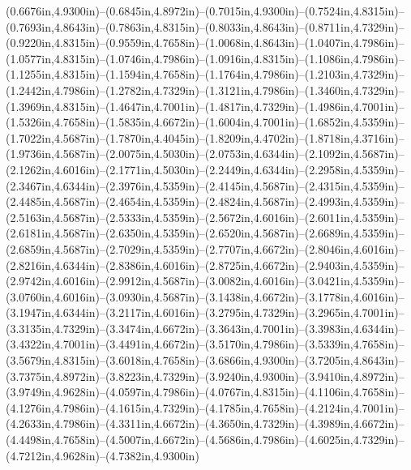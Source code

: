 (0.6676in,4.9300in)--(0.6845in,4.8972in)--(0.7015in,4.9300in)--(0.7524in,4.8315in)--(0.7693in,4.8643in)--(0.7863in,4.8315in)--(0.8033in,4.8643in)--(0.8711in,4.7329in)--(0.9220in,4.8315in)--(0.9559in,4.7658in)--(1.0068in,4.8643in)--(1.0407in,4.7986in)--(1.0577in,4.8315in)--(1.0746in,4.7986in)--(1.0916in,4.8315in)--(1.1086in,4.7986in)--(1.1255in,4.8315in)--(1.1594in,4.7658in)--(1.1764in,4.7986in)--(1.2103in,4.7329in)--(1.2442in,4.7986in)--(1.2782in,4.7329in)--(1.3121in,4.7986in)--(1.3460in,4.7329in)--(1.3969in,4.8315in)--(1.4647in,4.7001in)--(1.4817in,4.7329in)--(1.4986in,4.7001in)--(1.5326in,4.7658in)--(1.5835in,4.6672in)--(1.6004in,4.7001in)--(1.6852in,4.5359in)--(1.7022in,4.5687in)--(1.7870in,4.4045in)--(1.8209in,4.4702in)--(1.8718in,4.3716in)--(1.9736in,4.5687in)--(2.0075in,4.5030in)--(2.0753in,4.6344in)--(2.1092in,4.5687in)--(2.1262in,4.6016in)--(2.1771in,4.5030in)--(2.2449in,4.6344in)--(2.2958in,4.5359in)--(2.3467in,4.6344in)--(2.3976in,4.5359in)--(2.4145in,4.5687in)--(2.4315in,4.5359in)--(2.4485in,4.5687in)--(2.4654in,4.5359in)--(2.4824in,4.5687in)--(2.4993in,4.5359in)--(2.5163in,4.5687in)--(2.5333in,4.5359in)--(2.5672in,4.6016in)--(2.6011in,4.5359in)--(2.6181in,4.5687in)--(2.6350in,4.5359in)--(2.6520in,4.5687in)--(2.6689in,4.5359in)--(2.6859in,4.5687in)--(2.7029in,4.5359in)--(2.7707in,4.6672in)--(2.8046in,4.6016in)--(2.8216in,4.6344in)--(2.8386in,4.6016in)--(2.8725in,4.6672in)--(2.9403in,4.5359in)--(2.9742in,4.6016in)--(2.9912in,4.5687in)--(3.0082in,4.6016in)--(3.0421in,4.5359in)--(3.0760in,4.6016in)--(3.0930in,4.5687in)--(3.1438in,4.6672in)--(3.1778in,4.6016in)--(3.1947in,4.6344in)--(3.2117in,4.6016in)--(3.2795in,4.7329in)--(3.2965in,4.7001in)--(3.3135in,4.7329in)--(3.3474in,4.6672in)--(3.3643in,4.7001in)--(3.3983in,4.6344in)--(3.4322in,4.7001in)--(3.4491in,4.6672in)--(3.5170in,4.7986in)--(3.5339in,4.7658in)--(3.5679in,4.8315in)--(3.6018in,4.7658in)--(3.6866in,4.9300in)--(3.7205in,4.8643in)--(3.7375in,4.8972in)--(3.8223in,4.7329in)--(3.9240in,4.9300in)--(3.9410in,4.8972in)--(3.9749in,4.9628in)--(4.0597in,4.7986in)--(4.0767in,4.8315in)--(4.1106in,4.7658in)--(4.1276in,4.7986in)--(4.1615in,4.7329in)--(4.1785in,4.7658in)--(4.2124in,4.7001in)--(4.2633in,4.7986in)--(4.3311in,4.6672in)--(4.3650in,4.7329in)--(4.3989in,4.6672in)--(4.4498in,4.7658in)--(4.5007in,4.6672in)--(4.5686in,4.7986in)--(4.6025in,4.7329in)--(4.7212in,4.9628in)--(4.7382in,4.9300in) 